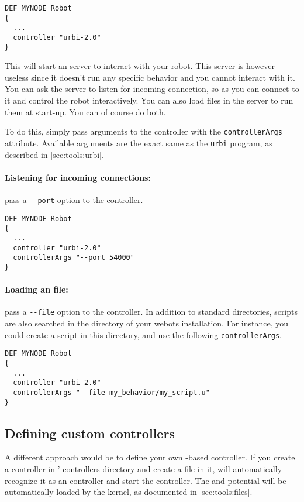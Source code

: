 \begin{lstlisting}
DEF MYNODE Robot
{
  ...
  controller "urbi-2.0"
}
\end{lstlisting}

This will start an \urbi server to interact with your robot. This
server is however useless since it doesn't run any specific behavior
and you cannot interact with it. You can ask the \urbi server to
listen for incoming connection, so as you can connect to it and
control the robot interactively. You can also load \us files in the
server to run them at start-up. You can of course do both.

To do this, simply pass arguments to the controller with the
\verb+controllerArgs+ \webots attribute. Available arguments are the
exact same as the \verb+urbi+ program, as described in
\autoref{sec:tools:urbi}.

\paragraph{Listening for incoming connections:} pass a \verb+--port+
option to the controller.

\begin{lstlisting}
DEF MYNODE Robot
{
  ...
  controller "urbi-2.0"
  controllerArgs "--port 54000"
}
\end{lstlisting}

\paragraph{Loading an \us file:} pass a \verb+--file+ option to the
controller. In addition to standard directories, scripts are also
searched in the  directory of
your webots installation. For instance, you could create a
 script in this directory, and use the
following \verb+controllerArgs+.

\begin{lstlisting}
DEF MYNODE Robot
{
  ...
  controller "urbi-2.0"
  controllerArgs "--file my_behavior/my_script.u"
}
\end{lstlisting}

\subsection{Defining custom \urbi controllers}

A different approach would be to define your own \urbi-based
controller. If you create a controller in \webots' controllers
directory and create a  file in it, \webots will
automatically recognize it as an \urbi controller and start the
 controller. The  and potential
 will be automatically loaded by the \urbi kernel, as
documented in \autoref{sec:tools:files}.

